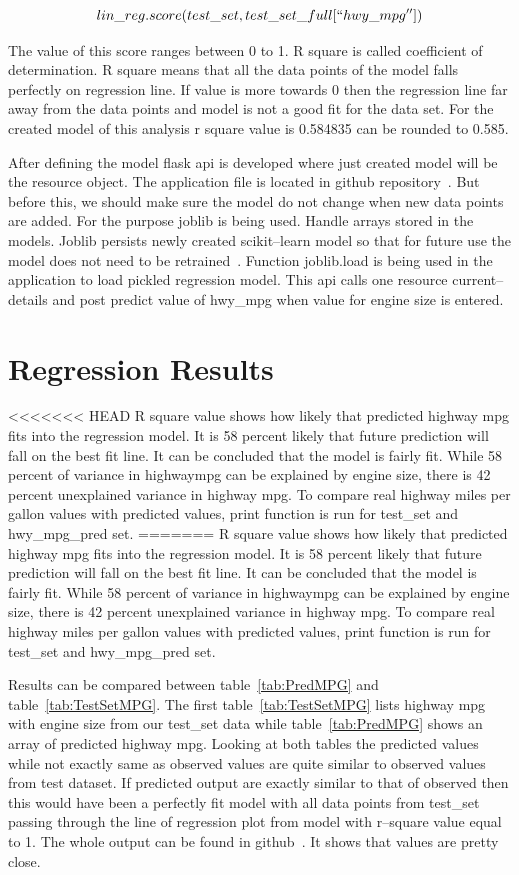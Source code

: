 \[lin\_reg.score(test\_set, test\_set\_full[``hwy\_mpg''])\]

The value of this score ranges between 0 to 1. R square is called
coefficient of determination. R square means that all the data points
of the model falls perfectly on regression line. If value is more
towards 0 then the regression line far away from the data points and
model is not a good fit for the data set. For the created model of
this analysis r square value is 0.584835 can be rounded to 0.585.
  
After defining the model flask api is developed where just created
model will be the resource object. The application file is located in
github repository~\cite{hid-sp18-415-regressionapi}. But before this,
we should make sure the model do not change when new data points are
added. For the purpose joblib is being used.  Handle arrays stored in
the models. Joblib persists newly created scikit--learn model so that
for future use the model does not need to be
retrained~\cite{hid-sp18-415-joblib}. Function joblib.load is being
used in the application to load pickled regression model. This api
calls one resource current--details and post predict value of hwy\_mpg
when value for engine size is entered.
   
  
\section{Regression Results}

<<<<<<< HEAD
R square value shows how likely that predicted highway mpg fits into
the regression model. It is 58 percent likely that future prediction
will fall on the best fit line. It can be concluded that the model is
fairly fit. While 58 percent of variance in highwaympg can be
explained by engine size, there is 42 percent unexplained variance in
highway mpg. To compare real highway miles per gallon values with
predicted values, print function is run for test\_set and
hwy\_mpg\_pred set.
=======
 R square value shows how likely that predicted highway mpg fits into the
 regression model. It is 58 percent likely that future prediction will fall
 on the best fit line. It can be concluded that the model is fairly fit. While 
 58 percent of variance in highwaympg can be explained by engine size,
 there is 42 percent unexplained
 variance in highway mpg. To compare real highway miles per gallon values with 
 predicted values, print function is
 run for test\_set and hwy\_mpg\_pred set.
 
 Results can be compared between table~\ref{tab:PredMPG} 
 and table~\ref{tab:TestSetMPG}. 
 The first table~\ref{tab:TestSetMPG} lists highway mpg with engine size from our
 test\_set data while table~\ref{tab:PredMPG} shows an array of predicted highway mpg. 
 Looking at both tables the predicted values while not exactly same as observed 
 values are quite similar to observed values from test dataset. If predicted
 output are exactly similar to that of observed then this would have been a 
 perfectly fit model with all data points from test\_set passing through the
 line of regression plot from model with r--square value equal to 1.
 The whole output can be found in github~\cite{hid-sp18-415-analysis}.
 It shows that values are pretty close.
 

